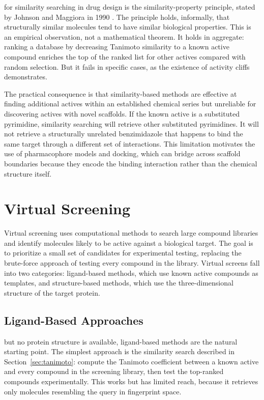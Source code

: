  for similarity searching in drug design is the similarity-property principle, stated by Johnson and Maggiora in 1990 \cite{johnson1990}. The principle holds, informally, that structurally similar molecules tend to have similar biological properties. This is an empirical observation, not a mathematical theorem. It holds in aggregate: ranking a database by decreasing Tanimoto similarity to a known active compound enriches the top of the ranked list for other actives compared with random selection. But it fails in specific cases, as the existence of activity cliffs demonstrates.

The practical consequence is that similarity-based methods are effective at finding additional actives within an established chemical series but unreliable for discovering actives with novel scaffolds. If the known active is a substituted pyrimidine, similarity searching will retrieve other substituted pyrimidines. It will not retrieve a structurally unrelated benzimidazole that happens to bind the same target through a different set of interactions. This limitation motivates the use of pharmacophore models and docking, which can bridge across scaffold boundaries because they encode the binding interaction rather than the chemical structure itself.


\section{Virtual Screening}
\label{sec:virtual-screening}

Virtual screening uses computational methods to search large compound libraries and identify molecules likely to be active against a biological target. The goal is to prioritize a small set of candidates for experimental testing, replacing the brute-force approach of testing every compound in the library. Virtual screens fall into two categories: ligand-based methods, which use known active compounds as templates, and structure-based methods, which use the three-dimensional structure of the target protein.


\subsection{Ligand-Based Approaches}
\label{sec:ligand-based}

 but no protein structure is available, ligand-based methods are the natural starting point. The simplest approach is the similarity search described in Section~\ref{sec:tanimoto}: compute the Tanimoto coefficient between a known active and every compound in the screening library, then test the top-ranked compounds experimentally. This works but has limited reach, because it retrieves only molecules resembling the query in fingerprint space.

